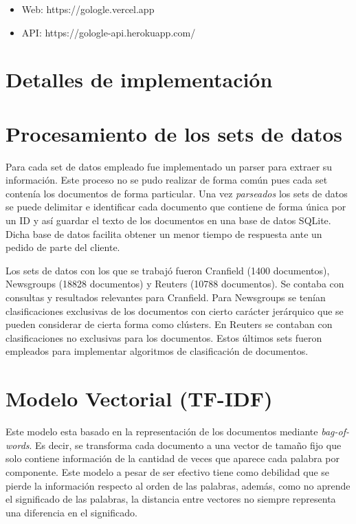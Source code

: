 \documentclass[12pt]{llncs}
\begin{document}
\begin{itemize}
  \item Web: https://gologle.vercel.app
  \item API: https://gologle-api.herokuapp.com/
\end{itemize}

\section*{Detalles de implementación}

\section{Procesamiento de los sets de datos}

Para cada set de datos empleado fue implementado un parser para extraer su información. Este proceso no se pudo realizar de forma común pues cada set contenía los documentos de forma particular. Una vez \textit{parseados} los sets de datos se puede delimitar e identificar cada documento que contiene de forma única por un ID y así guardar el texto de los documentos en una base de datos SQLite. Dicha base de datos facilita obtener un menor tiempo de respuesta ante un pedido de parte del cliente.

Los sets de datos con los que se trabajó fueron Cranfield (1400 documentos), Newsgroups (18828 documentos) y Reuters (10788 documentos). Se contaba con consultas y resultados relevantes para Cranfield. Para  Newsgroups se tenían clasificaciones exclusivas de los documentos con cierto carácter jerárquico que se pueden considerar de cierta forma como clústers. En Reuters se contaban con clasificaciones no exclusivas para los documentos. Estos últimos sets fueron empleados para implementar algoritmos de clasificación de documentos.

\section{Modelo Vectorial (TF-IDF) \cite{conf} } 

Este modelo esta basado en la representación de los documentos mediante \textit{bag-of-words}. Es decir, se transforma cada documento a una vector de tamaño fijo que solo contiene información de la cantidad de veces que aparece cada palabra por componente. Este modelo a pesar de ser efectivo tiene como debilidad que se pierde la información respecto al orden de las palabras, además, como no aprende el significado de las palabras, la distancia entre vectores no siempre representa una diferencia en el significado. 
\end{document}
